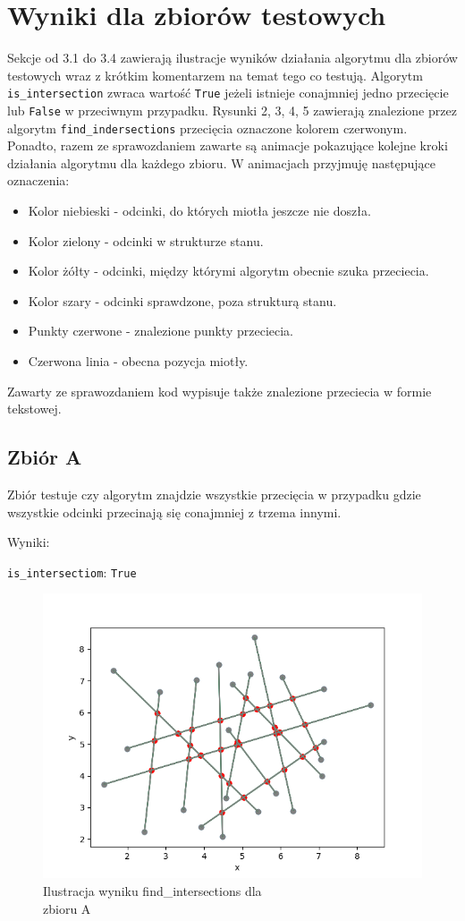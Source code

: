 \documentclass[11pt,a4paper]{article}
\begin{document}
\section{Wyniki dla zbiorów testowych}
Sekcje od 3.1 do 3.4 zawierają ilustracje wyników działania
algorytmu dla zbiorów testowych wraz z krótkim komentarzem
na temat tego co testują. Algorytm \verb|is_intersection|
zwraca wartość \verb|True| jeżeli istnieje conajmniej jedno
przecięcie lub \verb|False| w przeciwnym przypadku.
Rysunki 2, 3, 4, 5 zawierają znalezione
przez algorytm \verb|find_indersections| 
przecięcia oznaczone kolorem czerwonym.
Ponadto, razem ze sprawozdaniem zawarte są animacje
pokazujące kolejne kroki działania algorytmu dla każdego 
zbioru. W animacjach przyjmuję następujące oznaczenia:
\begin{itemize}
    \item Kolor niebieski - odcinki, do których miotła jeszcze nie doszła.
    \item Kolor zielony - odcinki w strukturze stanu.
    \item Kolor żółty - odcinki, między którymi algorytm obecnie szuka przeciecia.
    \item Kolor szary - odcinki sprawdzone, poza strukturą stanu.
    \item Punkty czerwone - znalezione punkty przeciecia.
    \item Czerwona linia - obecna pozycja miotły.
\end{itemize}
Zawarty ze sprawozdaniem kod wypisuje także znalezione
przeciecia w formie tekstowej.

\subsection{Zbiór A}
Zbiór testuje czy algorytm znajdzie wszystkie przecięcia
w przypadku gdzie wszystkie odcinki przecinają się 
conajmniej z trzema innymi.

Wyniki:

\verb|is_intersectiom|: \verb|True|

\begin{figure}[H]
    \centering
    \includegraphics[scale=0.5]{res/int_a.png}
    \caption{Ilustracja wyniku \ttfamily find\_intersections \normalfont dla \\zbioru A}
\end{figure}
\end{document}
